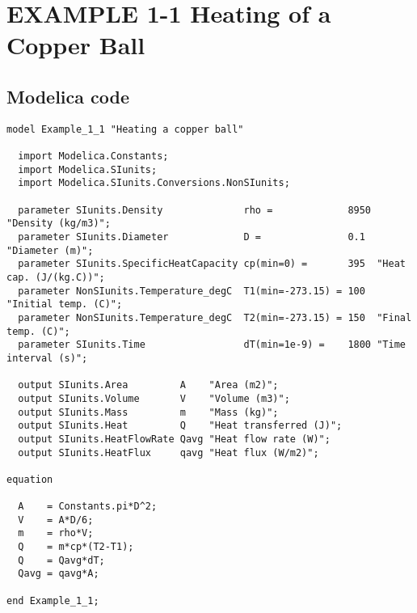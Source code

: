 \documentclass{modelica}
\begin{document}
\thispagestyle{empty}
\date{} %

\section*{EXAMPLE 1-1 Heating of a Copper Ball}

\subsection*{Modelica code}


\begin{lstlisting}[mathescape=true] 
model Example_1_1 "Heating a copper ball"

  import Modelica.Constants;
  import Modelica.SIunits;
  import Modelica.SIunits.Conversions.NonSIunits;

  parameter SIunits.Density              rho =             8950 "Density (kg/m3)";
  parameter SIunits.Diameter             D =               0.1  "Diameter (m)";
  parameter SIunits.SpecificHeatCapacity cp(min=0) =       395  "Heat cap. (J/(kg.C))";
  parameter NonSIunits.Temperature_degC  T1(min=-273.15) = 100  "Initial temp. (C)";
  parameter NonSIunits.Temperature_degC  T2(min=-273.15) = 150  "Final temp. (C)";
  parameter SIunits.Time                 dT(min=1e-9) =    1800 "Time interval (s)";

  output SIunits.Area         A    "Area (m2)";
  output SIunits.Volume       V    "Volume (m3)";
  output SIunits.Mass         m    "Mass (kg)";
  output SIunits.Heat         Q    "Heat transferred (J)";
  output SIunits.HeatFlowRate Qavg "Heat flow rate (W)";
  output SIunits.HeatFlux     qavg "Heat flux (W/m2)";

equation 

  A    = Constants.pi*D^2;
  V    = A*D/6;
  m    = rho*V;
  Q    = m*cp*(T2-T1);
  Q    = Qavg*dT;
  Qavg = qavg*A;
  
end Example_1_1;  
\end{lstlisting}
\end{document}
